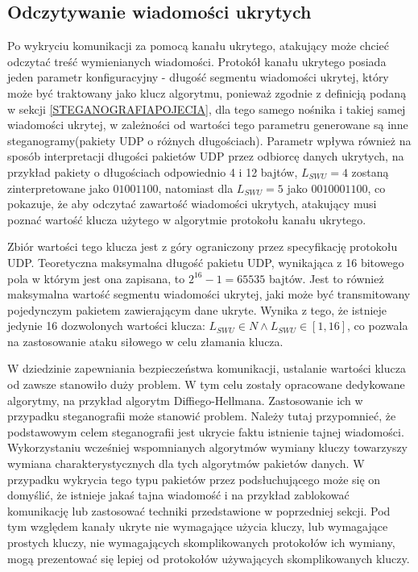 \documentclass[a4paper, twoside, 12pt]{report}
\begin{document}
       \subsection{Odczytywanie wiadomości ukrytych}
       Po wykryciu komunikacji za pomocą kanału ukrytego, atakujący może chcieć
       odczytać treść wymienianych wiadomości. Protokół kanału ukrytego posiada
       jeden parametr konfiguracyjny - długość segmentu wiadomości ukrytej, który
       może być traktowany jako klucz algorytmu, ponieważ zgodnie z definicją podaną
       w sekcji \ref{STEGANOGRAFIAPOJECIA}, dla tego samego nośnika i takiej samej
       wiadomości ukrytej, w zależności od wartości tego parametru generowane są
       inne steganogramy(pakiety UDP o różnych długościach). Parametr wpływa również
       na sposób interpretacji długości pakietów UDP przez odbiorcę danych ukrytych,
       na przykład pakiety o długościach odpowiednio 4 i 12 bajtów, \( L_{SWU} = 4 \)
       zostaną zinterpretowane jako \( 0100 1100 \), natomiast dla \( L_{SWU} = 5 \)
       jako \( 00100 01100 \), co pokazuje, że aby odczytać zawartość wiadomości
       ukrytych, atakujący musi poznać wartość klucza użytego w algorytmie protokołu
       kanału ukrytego.

       Zbiór wartości tego
       klucza jest z góry ograniczony przez specyfikację protokołu UDP. Teoretyczna
       maksymalna długość pakietu UDP, wynikająca z 16 bitowego pola w którym jest
       ona zapisana, to \(2^{16} - 1 = 65535\) bajtów. Jest to również maksymalna
       wartość segmentu wiadomości ukrytej, jaki może być transmitowany pojedynczym
       pakietem zawierającym dane ukryte. Wynika z tego, że istnieje jedynie 16
       dozwolonych wartości klucza: \( L_{SWU} \in N \land L_{SWU} \in [1, 16] \),
       co pozwala na zastosowanie ataku siłowego w celu złamania klucza.

       W dziedzinie zapewniania bezpieczeństwa komunikacji, ustalanie wartości
       klucza od zawsze stanowiło duży problem. W tym celu zostały opracowane
       dedykowane algorytmy, na przykład algorytm Diffiego-Hellmana. Zastosowanie
       ich w przypadku steganografii może stanowić problem. Należy tutaj przypomnieć,
       że podstawowym celem steganografii jest ukrycie faktu istnienie tajnej wiadomości.
       Wykorzystaniu wcześniej wspomnianych algorytmów wymiany kluczy towarzyszy
       wymiana charakterystycznych dla tych algorytmów pakietów danych. W przypadku
       wykrycia tego typu pakietów przez podsłuchującego może się on domyślić,
       że istnieje jakaś tajna wiadomość i na przykład zablokować komunikację lub
       zastosować techniki przedstawione w poprzedniej sekcji. Pod tym względem
       kanały ukryte nie wymagające użycia kluczy, lub wymagające prostych kluczy,
       nie wymagających skomplikowanych protokołów ich wymiany, mogą prezentować
       się lepiej od protokołów używających skomplikowanych kluczy.
\end{document}
